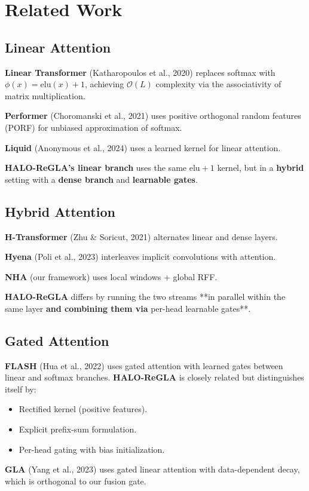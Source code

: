 
\section{Related Work}

\subsection{Linear Attention}

\textbf{Linear Transformer} (Katharopoulos et al., 2020) replaces softmax with 
$\phi(x) = \mathrm{elu}(x) + 1$, achieving $\mathcal{O}(L)$ complexity via 
the associativity of matrix multiplication.

\textbf{Performer} (Choromanski et al., 2021) uses positive orthogonal random 
features (PORF) for unbiased approximation of softmax.

\textbf{Liquid} (Anonymous et al., 2024) uses a learned kernel for linear attention.

\textbf{HALO-ReGLA's linear branch} uses the same $\mathrm{elu} + 1$ kernel, but 
in a \textbf{hybrid} setting with a \textbf{dense branch} and \textbf{learnable gates}.

\subsection{Hybrid Attention}

\textbf{H-Transformer} (Zhu \& Soricut, 2021) alternates linear and dense layers.

\textbf{Hyena} (Poli et al., 2023) interleaves implicit convolutions with attention.

\textbf{NHA} (our framework) uses local windows + global RFF.

\textbf{HALO-ReGLA} differs by running the two streams **in parallel within the 
same layer\textbf{ and combining them via }per-head learnable gates**.

\subsection{Gated Attention}

\textbf{FLASH} (Hua et al., 2022) uses gated attention with learned gates between 
linear and softmax branches. \textbf{HALO-ReGLA} is closely related but 
distinguishes itself by:
\begin{itemize}
\item Rectified kernel (positive features).
\item Explicit prefix-sum formulation.
\item Per-head gating with bias initialization.

\end{itemize}
\textbf{GLA} (Yang et al., 2023) uses gated linear attention with data-dependent 
decay, which is orthogonal to our fusion gate.

